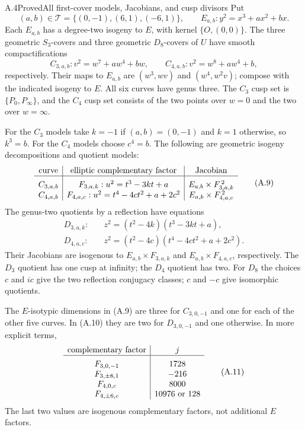 \begin{statement}{A.4}{Proved}{All first-cover models, Jacobians, and cusp divisors}
Put
\[
 (a,b)\in\mathcal T=\{(0,-1),(6,1),(-6,1)\},\qquad
 E_{a,b}:y^2=x^3+ax^2+bx.
\]
Each $E_{a,b}$ has a degree-two isogeny to $E$, with kernel
$\{O,(0,0)\}$. The three geometric $S_3$-covers and three geometric
$D_8$-covers of $U$ have smooth compactifications
\[
 C_{3,a,b}:v^2=w^7+aw^4+bw,\qquad
 C_{4,a,b}:v^2=w^8+aw^4+b,                         \tag{A.8}
\]
respectively. Their maps to $E_{a,b}$ are $(w^3,wv)$ and
$(w^4,w^2v)$; compose with the indicated isogeny to $E$.
All six curves have genus three. The $C_3$ cusp set is
$\{P_0,P_\infty\}$, and the $C_4$ cusp set consists of the two
points over $w=0$ and the two over $w=\infty$.

For the $C_3$ models take $k=-1$ if $(a,b)=(0,-1)$ and $k=1$
otherwise, so $k^3=b$. For the $C_4$ models choose $c^4=b$.
The following are geometric isogeny decompositions and quotient models:
\[
\begin{array}{c|c|c}
\text{curve}&\text{elliptic complementary factor}&\text{Jacobian}\\ \hline
C_{3,a,b}&F_{3,a,k}:u^2=t^3-3kt+a&E_{a,b}\times F_{3,a,k}^{\,2}\rule{0pt}{13pt}\\
C_{4,a,b}&F_{4,a,c}:u^2=t^4-4ct^2+a+2c^2&E_{a,b}\times F_{4,a,c}^{\,2}
\end{array}                                                     \tag{A.9}
\]
The genus-two quotients by a reflection have equations
\[
\begin{split}
 D_{3,a,k}:&\quad z^2=(t^2-4k)(t^3-3kt+a),\\
 D_{4,a,c}:&\quad z^2=(t^2-4c)(t^4-4ct^2+a+2c^2).
\end{split}                                                     \tag{A.10}
\]
Their Jacobians are isogenous to $E_{a,b}\times F_{3,a,k}$ and
$E_{a,b}\times F_{4,a,c}$, respectively. The $D_3$ quotient has
one cusp at infinity; the $D_4$ quotient has two. For $D_8$ the choices
$c$ and $ic$ give the two reflection conjugacy classes; $c$ and $-c$
give isomorphic quotients.

The $E$-isotypic dimensions in (A.9) are three for $C_{3,0,-1}$
and one for each of the other five curves. In (A.10) they are two
for $D_{3,0,-1}$ and one otherwise. In more explicit terms,
\[
\begin{array}{c|c}
\text{complementary factor}&j\\ \hline
F_{3,0,-1}&1728\rule{0pt}{13pt}\\
F_{3,\pm6,1}&-216\\
F_{4,0,c}&8000\\
F_{4,\pm6,c}&10976\text{ or }128
\end{array}                                                     \tag{A.11}
\]
The last two values are isogenous complementary factors, not additional
$E$ factors.


\end{statement}

